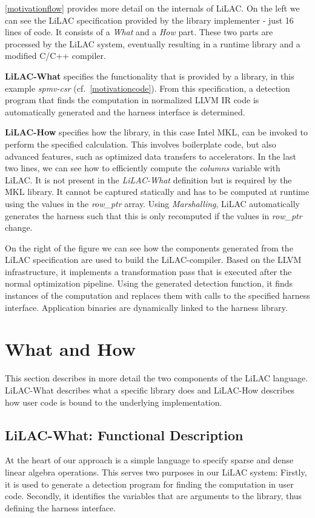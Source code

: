 \autoref{motivationflow} provides more detail on the internals of
LiLAC.  On the left we can see the LiLAC specification provided by the
library implementer - just 16 lines of code.  It consists of a
{\em What} and a {\em How} part.  These two parts are processed by the
LiLAC system, eventually resulting in a runtime library and a modified
C/C++ compiler.

{\bf LiLAC-What} specifies the functionality that is provided by a library,
in this example {\em spmv-csr} (cf.\ \autoref{motivationcode}).
From this specification, a detection program that finds the computation in
normalized LLVM IR code is automatically generated and the harness interface
is determined.

{\bf LiLAC-How} specifies how the library, in this case Intel MKL, can be
invoked to perform the specified calculation.
This involves boilerplate code, but also advanced features, such as optimized
data transfers to accelerators.
In the last two lines, we can see how to efficiently compute the {\em columns}
variable with LiLAC.
It is not present in the {\em LiLAC-What} definition but is required by the MKL library. It  cannot be
captured statically and has to be computed at runtime using the values in the
{\em row\_ptr} array.
Using {\em Marshalling}, LiLAC automatically generates the harness
such that this is only recomputed if the values in {\em row\_ptr} change.

On the right of the figure we can see how the components generated from the
LiLAC specification are used to build the LiLAC-compiler.
Based on the LLVM infrastructure, it implements a transformation pass that
is executed after the normal optimization pipeline.
Using the generated detection function, it finds instances of the computation
and replaces them with calls to the specified harness interface.
Application binaries are dynamically linked to the harness library.

\section{What and How}

This section describes in more detail the two components of the LiLAC language.
LiLAC-What describes what a specific library does and LiLAC-How describes how
user code is bound to the underlying implementation.

\subsection{LiLAC-What: Functional Description}
At the heart of our approach is a simple language to specify sparse and dense
linear algebra operations.
This serves two purposes in our LiLAC system: Firstly, it is used to generate
a detection program for finding the computation in user code.
Secondly, it identifies the variables that are arguments to the library, thus
defining the harness interface.

